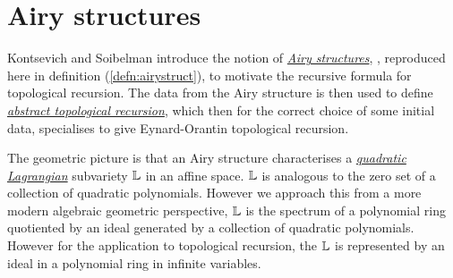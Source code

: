 












\chapter{Airy structures}
    \label{chapter:airy}
    Kontsevich and Soibelman introduce the notion of \emph{\hyperref[defn:airystruct]{Airy structures}}, \cite{ks_airy}, reproduced here in definition (\ref{defn:airystruct}), to motivate the recursive formula for topological recursion. The data from the Airy structure is then used to define \emph{\hyperref[sec:abstract_top_rec]{abstract topological recursion}}, which then for the correct choice of some initial data, specialises to give Eynard-Orantin topological recursion. 
    
    The geometric picture is that an Airy structure characterises a \emph{\hyperref[defn:quadlag]{quadratic Lagrangian}} subvariety \( \mathbb{L}\) in an affine space. \( \mathbb{L} \) is analogous to the zero set of a collection of quadratic polynomials. However we approach this from a more modern algebraic geometric perspective, \(\mathbb{L}\) is the spectrum of a polynomial ring quotiented by an ideal generated by a collection of quadratic polynomials. However for the application to topological recursion, the \( \mathbb{L}\) is represented by an ideal in a polynomial ring in infinite variables.
    
